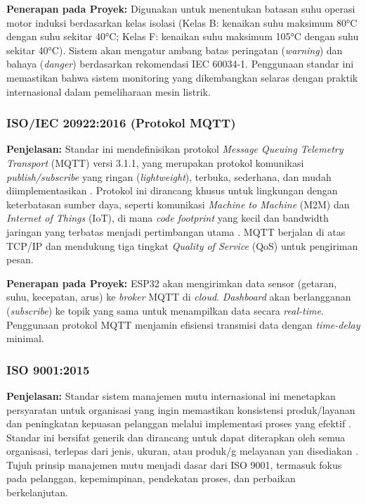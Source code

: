 \documentclass{elsinta}
\begin{document}
\textbf{Penerapan pada Proyek:} Digunakan untuk menentukan batasan suhu operasi motor induksi berdasarkan kelas isolasi (Kelas B: kenaikan suhu maksimum 80°C dengan suhu sekitar 40°C; Kelas F: kenaikan suhu maksimum 105°C dengan suhu sekitar 40°C). Sistem akan mengatur ambang batas peringatan (\textit{warning}) dan bahaya (\textit{danger}) berdasarkan rekomendasi IEC 60034-1. Penggunaan standar ini memastikan bahwa sistem monitoring yang dikembangkan selaras dengan praktik internasional dalam pemeliharaan mesin listrik.

\subsubsection{ISO/IEC 20922:2016 (Protokol MQTT)}

\textbf{Penjelasan:} Standar ini mendefinisikan protokol \textit{Message Queuing Telemetry Transport} (MQTT) versi 3.1.1, yang merupakan protokol komunikasi \textit{publish/subscribe} yang ringan (\textit{lightweight}), terbuka, sederhana, dan mudah diimplementasikan \cite{InternationalOrganizationforStandardizationInternationalElectrotechnicalCommission2016}. Protokol ini dirancang khusus untuk lingkungan dengan keterbatasan sumber daya, seperti komunikasi \textit{Machine to Machine} (M2M) dan \textit{Internet of Things} (IoT), di mana \textit{code footprint} yang kecil dan bandwidth jaringan yang terbatas menjadi pertimbangan utama \cite{InternationalOrganizationforStandardizationInternationalElectrotechnicalCommission2016}. MQTT berjalan di atas TCP/IP dan mendukung tiga tingkat \textit{Quality of Service} (QoS) untuk pengiriman pesan.

\textbf{Penerapan pada Proyek:} ESP32 akan mengirimkan data sensor (getaran, suhu, kecepatan, arus) ke \textit{broker} MQTT di \textit{cloud}. \textit{Dashboard} akan berlangganan (\textit{subscribe}) ke topik yang sama untuk menampilkan data secara \textit{real-time}. Penggunaan protokol MQTT menjamin efisiensi transmisi data dengan \textit{time-delay} minimal.

\subsubsection{ISO 9001:2015}

\textbf{Penjelasan:} Standar sistem manajemen mutu internasional ini menetapkan persyaratan untuk organisasi yang ingin memastikan konsistensi produk/layanan dan peningkatan kepuasan pelanggan melalui implementasi proses yang efektif \cite{InternationalOrganizationforStandardization2015}. Standar ini bersifat generik dan dirancang untuk dapat diterapkan oleh semua organisasi, terlepas dari jenis, ukuran, atau produk/g melayanan yan disediakan \cite{ISOTC1762016}. Tujuh prinsip manajemen mutu menjadi dasar dari ISO 9001, termasuk fokus pada pelanggan, kepemimpinan, pendekatan proses, dan perbaikan berkelanjutan.
\end{document}
